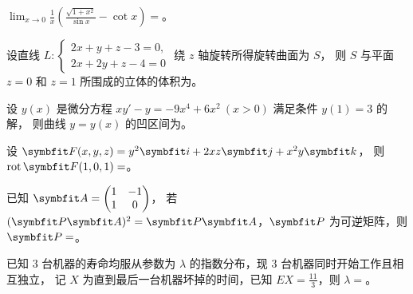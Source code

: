 \begin{question}[index=11]
$\displaystyle\lim_{x\to0}\frac1x\left(\frac{\sqrt{1+x^2}}{\sin x}-\cot x\right)=$\fillin。
\end{question}
\QuestionBreak

\begin{question}[index=12]
设直线 $L:\begin{cases}2x+y+z-3=0,\\2x+2y+z-4=0\end{cases}$
绕 $z$ 轴旋转所得旋转曲面为 $S$，
则 $S$ 与平面 $z=0$ 和 $z=1$ 所围成的立体的体积为\fillin。
\end{question}
\QuestionBreak

\begin{question}[index=13]
设 $y(x)$ 是微分方程 $xy'-y=-9x^4+6x^2\ (x>0)$ 满足条件 $y(1)=3$ 的解，
则曲线 $y=y(x)$ 的凹区间为\fillin。
\end{question}
\QuestionBreak

\begin{question}[index=14]
设 $\symbfit F(x,y,z)=y^2\symbfit i+2xz\symbfit j+x^2y\symbfit k$，
则 $\operatorname{rot}\symbfit F(1,0,1)=$\fillin。
\end{question}
\QuestionBreak

\begin{question}[index=15]
已知 $\symbfit A=\begin{pmatrix}1&-1\\1&0\end{pmatrix}$，
若 $(\symbfit P\symbfit A)^2=\symbfit P\symbfit A$，$\symbfit P$ 为可逆矩阵，则 $\symbfit P=$\fillin。
\end{question}
\QuestionBreak

\begin{question}[index=16]
已知 $3$ 台机器的寿命均服从参数为 $\lambda$ 的指数分布，现 $3$ 台机器同时开始工作且相互独立，
记 $X$ 为直到最后一台机器坏掉的时间，已知 $\displaystyle EX=\frac{11}3$，则 $\lambda=$\fillin。
\end{question}
